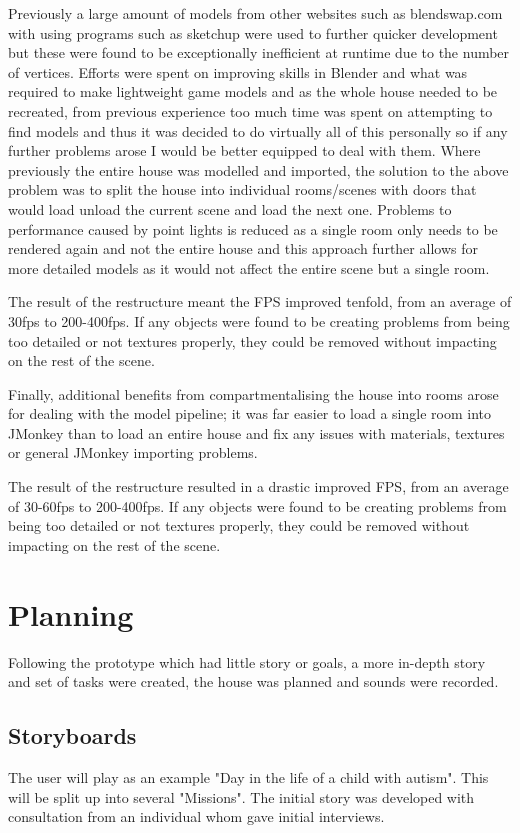 \documentclass[11pt]{report}
\begin{document}
Previously a large amount of models from other websites such as blendswap.com with using programs such as sketchup were used to further quicker development but these were found to be exceptionally inefficient at runtime due to the number of vertices. Efforts were spent on improving skills in Blender and what was required to make lightweight game models and as the whole house needed to be recreated, from previous experience too much time was spent on attempting to find models and thus it was decided to do virtually all of this personally so if any further problems arose I would be better equipped to deal with them. Where previously the entire house was modelled and imported, the solution to the above problem was to split the house into individual rooms/scenes with doors that would load unload the current scene and load the next one. Problems to performance caused by point lights is reduced as a single room only needs to be rendered again and not the entire house and this approach further allows for more detailed models as it would not affect the entire scene but a single room.  

The result of the restructure meant the FPS improved tenfold, from an average of 30fps to 200-400fps. If any objects were found to be creating problems from being too detailed or not textures properly, they could be removed without impacting on the rest of the scene.

Finally, additional benefits from compartmentalising the house into rooms arose for dealing with the model pipeline; it was far easier to load a single room into JMonkey than to load an entire house and fix any issues with materials, textures or general JMonkey importing problems.

The result of the restructure resulted in a drastic improved FPS, from an average of 30-60fps to 200-400fps. If any objects were found to be creating problems from being too detailed or not textures properly, they could be removed without impacting on the rest of the scene.

\section{Planning}

Following the prototype which had little story or goals, a more in-depth story and set of tasks were created, the house was planned and sounds were recorded.

\subsection{Storyboards}
The user will play as an example "Day in the life of a child with autism". This will be split up into several "Missions". The initial story was developed with consultation from an individual whom gave initial interviews. 
\end{document}
